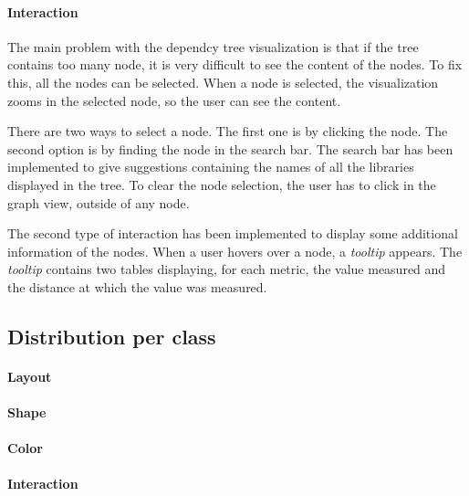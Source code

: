 \paragraph{Interaction}
The main problem with the dependcy tree visualization is that if the tree contains too many node, it is very difficult to see the content of the nodes. To fix this, all the nodes can be selected. When a node is selected, the visualization zooms in the selected node, so the user can see the content.

There are two ways to select a node. The first one is by clicking the node. The second option is by finding the node in the search bar. The search bar has been implemented to give suggestions containing the names of all the libraries displayed in the tree. To clear the node selection, the user has to click in the graph view, outside of any node.

The second type of interaction has been implemented to display some additional information of the nodes. When a user hovers over a node, a \textit{tooltip} appears. The \textit{tooltip} contains two tables displaying, for each metric, the value measured and the distance at which the value was measured.

\subsection{Distribution per class}

\paragraph{Layout}
\paragraph{Shape}
\paragraph{Color}
\paragraph{Interaction}
